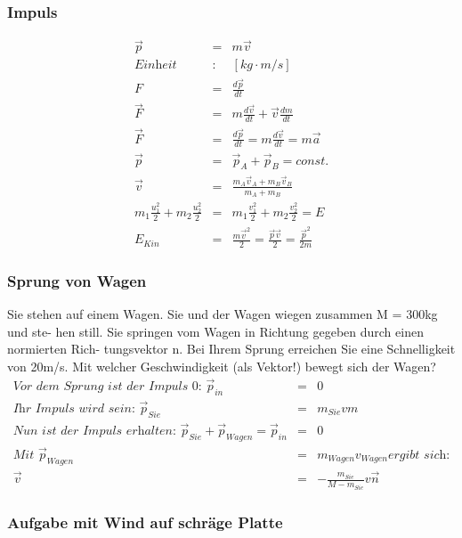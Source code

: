 \documentclass[11pt]{article}
\begin{document}
\subsubsection{Impuls}
\begin{eqnarray*}
\overrightarrow{p}&=&m\overrightarrow{v}\\
\textit{Einheit }&:& [kg\cdot m/s]\\
F &=& \frac{d\overrightarrow{p}}{dt} \\
\overrightarrow{F} &=& m\frac{d\overrightarrow{v}}{dt}+\overrightarrow{v}\frac{dm}{dt}\\
\overrightarrow{F} &=& \frac{d\overrightarrow{p}}{dt}= m\frac{d\overrightarrow{v}}{dt}=m\overrightarrow{a}\\
\overrightarrow{p} &=& \overrightarrow{p}_A+\overrightarrow{p}_B = const.\\
\overrightarrow{v}&=&\frac{m_A\overrightarrow{v}_A+m_B\overrightarrow{v}_B}{m_A+m_B}\\
m_1\frac{u_1^2}{2}+m_2\frac{u_2^2}{2} &=& m_1\frac{v_1^2}{2}+ m_2\frac{v_2^2}{2} = E\\
E_{Kin} &=& \frac{m\overrightarrow{v}^2}{2} = \frac{\overrightarrow{p}\overrightarrow{v}}{2} = \frac{\overrightarrow{p}^2}{2m}
\end{eqnarray*}


\subsubsection{Sprung von Wagen}
Sie stehen auf einem Wagen. Sie und der Wagen wiegen zusammen M = 300kg und ste-
hen still. Sie springen vom Wagen in Richtung gegeben durch einen normierten Rich-
tungsvektor n. Bei Ihrem Sprung erreichen Sie eine Schnelligkeit von 20m/s. Mit welcher
Geschwindigkeit (als Vektor!) bewegt sich der Wagen?
\begin{eqnarray*}
\textit{Vor dem Sprung ist der Impuls 0: } \overrightarrow{p}_{in}&=& 0\\
\textit{Ihr Impuls wird sein: } \overrightarrow{p}_{Sie}&=&m_{Sie}vm\\
\textit{Nun ist der Impuls erhalten: } \overrightarrow{p}_{Sie} + \overrightarrow{p}_{Wagen} = \overrightarrow{p}_{in} &=& 0\\
\textit{Mit } \overrightarrow{p}_{Wagen} &=& m_{Wagen} v_{Wagen} \textit{ergibt sich:}\\
\overrightarrow{v}&=& -\frac{m_{Sie}}{M-m_{Sie}}v\overrightarrow{n}
\end{eqnarray*}
\subsubsection{Aufgabe mit Wind auf schräge Platte}
\end{document}
